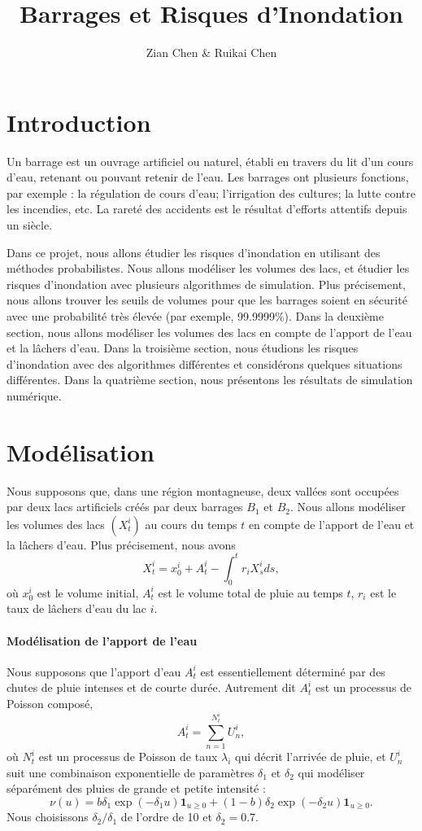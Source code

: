 \documentclass{article}
\title{Barrages et Risques d’Inondation}
\author{Zian Chen \& Ruikai Chen}
\begin{document}
\maketitle						%

\section{Introduction}
Un barrage est un ouvrage artificiel ou naturel, établi en travers du lit
d'un cours d'eau, retenant ou pouvant retenir de l'eau. Les barrages ont plusieurs fonctions, par exemple : la régulation de cours d'eau; l'irrigation des cultures; la lutte contre les incendies, etc. La rareté des accidents est le résultat d'efforts attentifs depuis un siècle.

Dans ce projet, nous allons étudier les risques d'inondation en utilisant des méthodes probabilistes. Nous allons modéliser les volumes des lacs, et étudier les risques d'inondation avec plusieurs algorithmes de simulation. Plus précisement, nous allons trouver les seuils de volumes pour que les barrages soient en sécurité avec une probabilité très élevée (par exemple, 99.9999\%). Dans la deuxième section, nous allons modéliser les volumes des lacs en compte de l'apport de l'eau et la lâchers d'eau. Dans la troisième section, nous étudions les risques d'inondation avec des algorithmes différentes et considérons quelques situations différentes. Dans la quatrième section, nous présentons les résultats de simulation numérique.
\section{Modélisation}
Nous supposons que, dans une région montagneuse, deux vallées
sont occupées par deux lacs artificiels créés par deux barrages $B_1$ et $B_2$. Nous allons modéliser les volumes des lacs $(X_t^i)$ au cours du temps $t$ en compte de l'apport de l'eau et la lâchers d'eau. Plus précisement, nous avons
\begin{equation}\label{eq_X}
  X_t^i = x_0^i + A_t^i - \int_0^t r_iX_s^i  ds,
\end{equation}
où $x_0^i$ est le volume initial, $A_t^i$ est le volume total de pluie au temps $t$, $r_i$ est le taux de lâchers d'eau du lac $i$.
\paragraph{Modélisation de l'apport de l'eau} Nous supposons que l'apport d'eau $A^i_t$ est essentiellement déterminé par des chutes de pluie intenses
et de courte durée. Autrement dit $A_t^i$ est un processus de Poisson composé,
\[A_t^i = \sum_{n=1}^{N_t^i} U_n^i,\]
où $N_t^i$ est un processus de Poisson de taux $\lambda_i$ qui décrit l'arrivée de pluie, et $U_n^i$ suit une combinaison exponentielle de paramètres $\delta_1$ et $\delta_2$ qui modéliser séparément des pluies de grande et petite intensité :
\[\nu(u) = b\delta_1\exp(-\delta_1 u)\mathbf{1}_{u\geq 0} + (1-b)\delta_2\exp(-\delta_2 u)\mathbf{1}_{u\geq 0}.\]
Nous choisissons $\delta_2/\delta_1$ de l'ordre de 10 et $\delta_2 = 0.7$.
\end{document}
